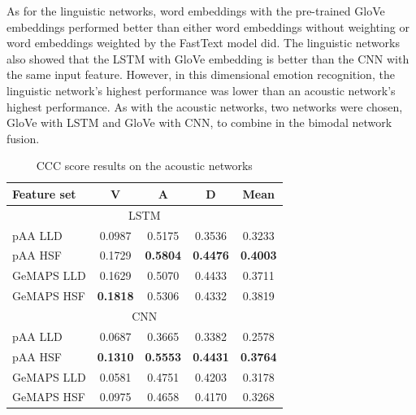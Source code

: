 As for the linguistic networks, word embeddings with the pre-trained GloVe
embeddings performed better than either word embeddings without weighting or
word embeddings weighted by the FastText model did. The linguistic networks
also showed that the LSTM with GloVe embedding is better than the CNN with the
same input feature. However, in this dimensional emotion recognition, the
linguistic network's highest performance was lower than an acoustic network's
highest performance. As with the acoustic networks, two networks were chosen,
GloVe with LSTM and GloVe with CNN, to combine in the bimodal network fusion. 

\begin{table}[htpb]
  \caption{CCC score results on the acoustic networks}
  \begin{center}
 \label{tab:acoustic-result}
 \begin{tabular}{l c c c c}
 \hline 
Feature set & V & A & D & Mean \\
\hline \hline
\multicolumn{5}{c}{LSTM} \\
pAA LLD & 0.0987 & 0.5175 & 0.3536 & 0.3233 \\
pAA HSF & 0.1729 & \textbf{0.5804} & \textbf{0.4476} & \textbf{0.4003} \\
GeMAPS LLD & 0.1629 & 0.5070 & 0.4433 & 0.3711 \\
GeMAPS HSF & \textbf{0.1818} & 0.5306 & 0.4332 & 0.3819 \\
 \hline
\multicolumn{5}{c}{CNN} \\ 
pAA LLD & 0.0687 & 0.3665 & 0.3382 & 0.2578 \\
pAA HSF & \textbf{0.1310} & \textbf{0.5553} & \textbf{0.4431} & \textbf{0.3764}
\\
GeMAPS LLD & 0.0581 & 0.4751 & 0.4203 & 0.3178 \\
GeMAPS HSF & 0.0975 & 0.4658 & 0.4170 & 0.3268 \\
 \hline
 \end{tabular}
\end{center}
\end{table} 

